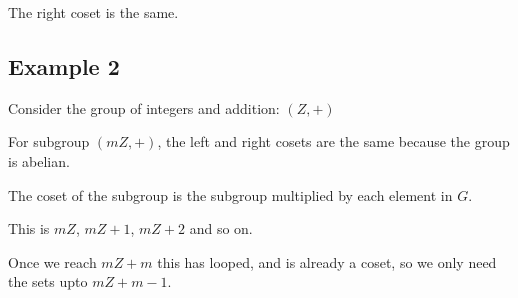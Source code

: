 The right coset is the same.

\subsection{Example 2}

Consider the group of integers and addition: \((Z,+)\)

For subgroup \((mZ,+)\), the left and right cosets are the same because the group is abelian.

The coset of the subgroup is the subgroup multiplied by each element in \(G\).

This is \(mZ\), \(mZ+1\), \(mZ+2\) and so on.

Once we reach \(mZ+m\) this has looped, and is already a coset, so we only need the sets upto \(mZ+m-1\).

